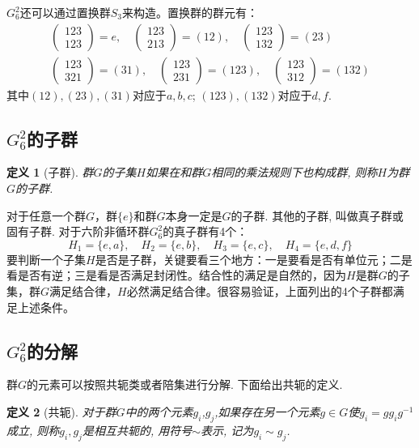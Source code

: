 \documentclass[UTF8]{ctexart}
\newtheorem{define}{定义}
\begin{document}
$G_6^2$还可以通过置换群$S_3$来构造。置换群的群元有：
\begin{gather}
\begin{pmatrix}
123 \\
123
\end{pmatrix} = e, \quad
\begin{pmatrix}
123 \\
213
\end{pmatrix} = (12), \quad
\begin{pmatrix}
123 \\
132
\end{pmatrix} = (23) \\
\begin{pmatrix}
123 \\
321
\end{pmatrix} = (31), \quad
\begin{pmatrix}
123 \\
231
\end{pmatrix} = (123), \quad
\begin{pmatrix}
123 \\
312
\end{pmatrix} = (132)
\end{gather}
其中$(12),(23),(31)$对应于$a,b,c$; $(123),(132)$对应于$d,f$.

\subsection{$G_6^2$的子群}
\begin{define}[子群]
群$G$的子集$H$如果在和群$G$相同的乘法规则下也构成群, 则称$H$为群$G$的子群. 
\end{define}

对于任意一个群$G$，群$\{e\}$和群$G$本身一定是$G$的子群. 其他的子群, 叫做真子群或固有子群. 对于六阶非循环群$G_6^2$的真子群有4个：
\begin{equation}
H_1 = \{e,a\}, \quad H_2 = \{e,b\}, \quad H_3 = \{e,c\}, \quad H_4 = \{e,d,f\}
\end{equation}
要判断一个子集$H$是否是子群，关键要看三个地方：一是要看是否有单位元；二是看是否有逆；三是看是否满足封闭性。结合性的满足是自然的，因为$H$是群$G$的子集，群$G$满足结合律，$H$必然满足结合律。很容易验证，上面列出的4个子群都满足上述条件。
\subsection{$G_6^2$的分解}
群$G$的元素可以按照共轭类或者陪集进行分解. 下面给出共轭的定义.
\begin{define}[共轭]
对于群$G$中的两个元素$g_i$,$g_j$,如果存在另一个元素$g\in G$使$g_i = g g_i g^{-1}$成立, 则称$g_i,g_j$是相互共轭的, 用符号$\sim$表示, 记为$g_i \sim g_j$. 
\end{define}
\end{document}
